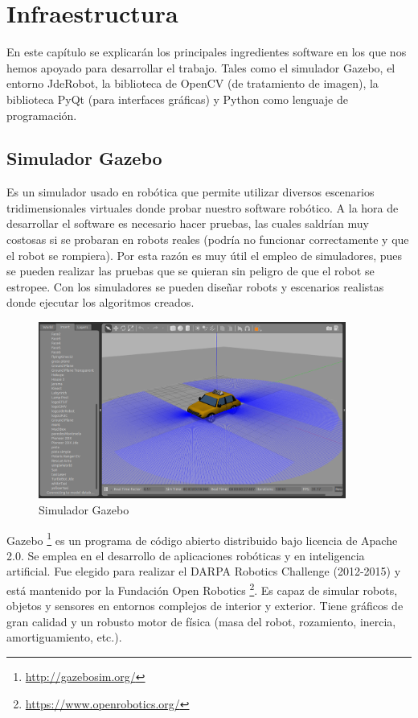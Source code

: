 \chapter{Infraestructura}\label{cap.infraestructura}
En este capítulo se explicarán los principales ingredientes software en los que nos hemos apoyado para desarrollar el trabajo. Tales como el simulador Gazebo, el entorno JdeRobot, la biblioteca de OpenCV (de tratamiento de imagen), la biblioteca PyQt (para interfaces gráficas) y Python como lenguaje de programación.

\section{Simulador Gazebo}

Es un simulador usado en robótica que permite utilizar diversos escenarios tridimensionales virtuales donde probar nuestro software robótico. A la hora de desarrollar el software es necesario hacer pruebas, las cuales saldrían muy costosas si se probaran en robots reales (podría no funcionar correctamente y que el robot se rompiera). Por esta razón es muy útil el empleo de simuladores, pues se pueden realizar las pruebas que se quieran sin peligro de que el robot se estropee. Con los simuladores se pueden diseñar robots y escenarios realistas donde ejecutar los algoritmos creados.

\begin{figure}[H]
  \begin{center}
    \includegraphics[width=0.9\textwidth]{figures/Infraestructura/gazebo.png}
		\caption{Simulador Gazebo}
		\label{fig.gazebo}
		\end{center}
\end{figure}
 
Gazebo \footnote{\url{http://gazebosim.org/}} es un programa de código abierto distribuido bajo licencia de Apache 2.0. Se emplea en el desarrollo de aplicaciones robóticas y en inteligencia artificial. Fue elegido para realizar el DARPA Robotics Challenge (2012-2015) y está mantenido por la Fundación Open Robotics \footnote{\url{https://www.openrobotics.org/}}. Es capaz de simular robots, objetos y sensores en entornos complejos de interior y exterior. Tiene gráficos de gran calidad y un robusto motor de física (masa del robot, rozamiento, inercia, amortiguamiento, etc.).\\


